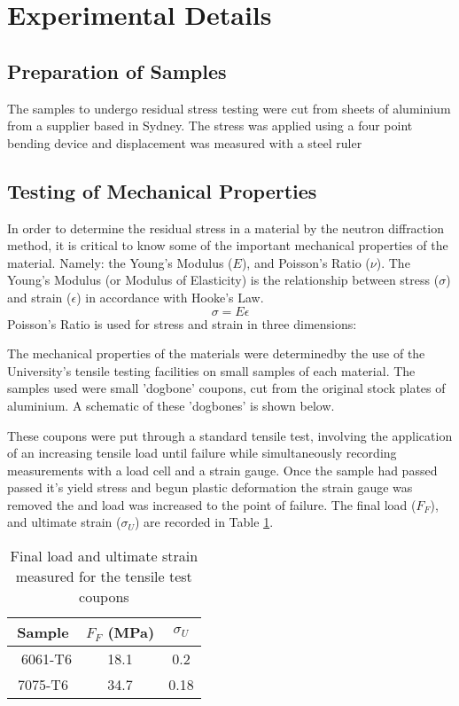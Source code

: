 \documentclass[11pt, oneside]{article}   	%
\begin{document}
\section{Experimental Details}
\subsection{Preparation of Samples}
The samples to undergo residual stress testing were cut from sheets of aluminium from a supplier based in Sydney. The stress was applied using a four point bending device and displacement was measured with a steel ruler
\subsection{Testing of Mechanical Properties}
In order to determine the residual stress in a material by the neutron diffraction method, it is critical to know some of the important mechanical properties of the material. Namely: the Young's Modulus ($E$), and Poisson's Ratio ($\nu$). The Young's Modulus (or Modulus of Elasticity) is the relationship between stress ($\sigma$) and strain ($\epsilon$) in accordance with Hooke's Law.
$$\sigma = E\epsilon$$
Poisson's Ratio is used for stress and strain in three dimensions:

The mechanical properties of the materials were determinedby the use of the University's tensile testing facilities on small samples of each material. The samples used were small 'dogbone' coupons, cut from the original stock plates of aluminium. A schematic of these 'dogbones' is shown below.

These coupons were put through a standard tensile test, involving the application of an increasing tensile load until failure while simultaneously recording measurements with a load cell and a strain gauge. Once the sample had passed passed it's yield stress and begun plastic deformation the strain gauge was removed the and load was increased to the point of failure. The final load ($F_F$), and ultimate strain ($\sigma_U$) are recorded in Table \ref{tab:a}.
\begin{table}[h]
	\centering
	\caption{Final load and ultimate strain measured for the tensile test coupons}\label{tab:a}
	\begin{tabular}[c]{c | c c}
	Sample & $F_F$ (\si{\mega\pascal}) & $\sigma_U$ \\ \hline\
	6061-T6 & 18.1 & 0.2 \\
	7075-T6 & 34.7 & 0.18 \\
	\end{tabular}
\end{table}
\end{document}
